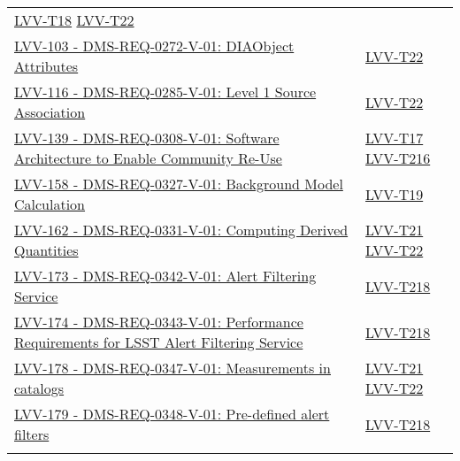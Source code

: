 {\begin{longtable}[]{p{13cm}p{3cm}}
{ \hyperref[lvv-t18]{LVV-T18} \hyperref[lvv-t22]{LVV-T22}} \\ 
 \href{https://jira.lsstcorp.org/browse/LVV-103}{ LVV-103 - DMS-REQ-0272-V-01: DIAObject Attributes } & 
{ \hyperref[lvv-t22]{LVV-T22}} \\ 
 \href{https://jira.lsstcorp.org/browse/LVV-116}{ LVV-116 - DMS-REQ-0285-V-01: Level 1 Source Association } & 
{ \hyperref[lvv-t22]{LVV-T22}} \\ 
 \href{https://jira.lsstcorp.org/browse/LVV-139}{ LVV-139 - DMS-REQ-0308-V-01: Software Architecture to Enable Community Re-Use } & 
{ \hyperref[lvv-t17]{LVV-T17} \hyperref[lvv-t216]{LVV-T216}} \\ 
 \href{https://jira.lsstcorp.org/browse/LVV-158}{ LVV-158 - DMS-REQ-0327-V-01: Background Model Calculation } & 
{ \hyperref[lvv-t19]{LVV-T19}} \\ 
 \href{https://jira.lsstcorp.org/browse/LVV-162}{ LVV-162 - DMS-REQ-0331-V-01: Computing Derived Quantities } & 
{ \hyperref[lvv-t21]{LVV-T21} \hyperref[lvv-t22]{LVV-T22}} \\ 
 \href{https://jira.lsstcorp.org/browse/LVV-173}{ LVV-173 - DMS-REQ-0342-V-01: Alert Filtering Service } & 
{ \hyperref[lvv-t218]{LVV-T218}} \\ 
 \href{https://jira.lsstcorp.org/browse/LVV-174}{ LVV-174 - DMS-REQ-0343-V-01: Performance Requirements for LSST Alert Filtering Service } & 
{ \hyperref[lvv-t218]{LVV-T218}} \\ 
 \href{https://jira.lsstcorp.org/browse/LVV-178}{ LVV-178 - DMS-REQ-0347-V-01: Measurements in catalogs } & 
{ \hyperref[lvv-t21]{LVV-T21} \hyperref[lvv-t22]{LVV-T22}} \\ 
 \href{https://jira.lsstcorp.org/browse/LVV-179}{ LVV-179 - DMS-REQ-0348-V-01: Pre-defined alert filters } & 
{ \hyperref[lvv-t218]{LVV-T218}} \\ 
\tabularnewline
\bottomrule
\end{longtable}}

